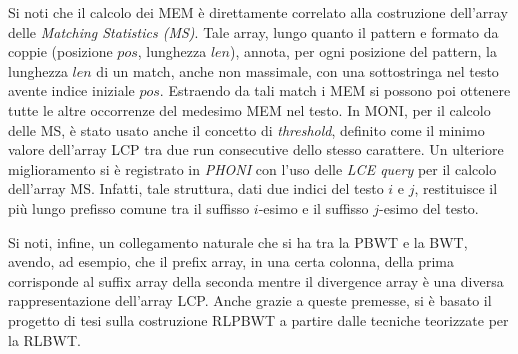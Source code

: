 \documentclass[a4paper,11pt, oneside,italian]{article}
\begin{document}
Si noti che il calcolo dei MEM è direttamente
correlato alla costruzione dell'array delle \textit{Matching Statistics (MS)}.
Tale array, lungo quanto il pattern e formato da coppie (posizione $pos$,
lunghezza $len$), annota, per ogni posizione del pattern, la lunghezza $len$ di
un match, anche non massimale, con una sottostringa nel testo avente
indice iniziale $pos$. Estraendo da tali match i MEM si possono poi ottenere
tutte le altre occorrenze del medesimo MEM nel testo. 
In MONI, per il calcolo delle MS, è stato
usato anche il concetto di \textit{threshold}, definito come
il minimo valore dell'array LCP tra due run consecutive dello stesso
carattere. Un ulteriore miglioramento si è registrato in \textit{PHONI} con
l'uso delle \textit{LCE query} per il calcolo dell'array MS. Infatti, tale
struttura, dati due indici del testo $i$ e $j$, restituisce il più lungo
prefisso comune tra il suffisso $i$-esimo e il suffisso $j$-esimo del testo.

Si noti, infine, un collegamento naturale che si ha tra la PBWT
e la BWT, avendo, ad esempio, che il prefix array, in una certa colonna, della
prima corrisponde al suffix array della seconda mentre il divergence array è una
diversa rappresentazione dell'array LCP. Anche grazie a queste premesse, si è
basato il progetto di tesi sulla costruzione RLPBWT a partire dalle tecniche
teorizzate per la RLBWT.

\end{document}
